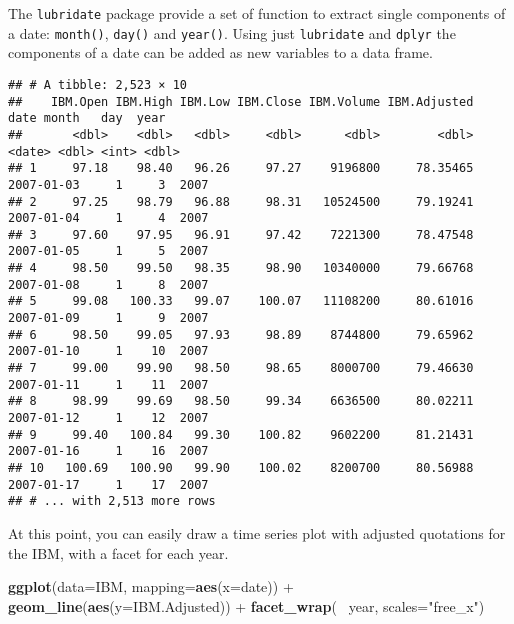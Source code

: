 \documentclass[]{book}
\newenvironment{Shaded}{\begin{snugshade}}{\end{snugshade}}
\newcommand{\KeywordTok}[1]{\textcolor[rgb]{0.13,0.29,0.53}{\textbf{{#1}}}}
\newcommand{\DataTypeTok}[1]{\textcolor[rgb]{0.13,0.29,0.53}{{#1}}}
\newcommand{\StringTok}[1]{\textcolor[rgb]{0.31,0.60,0.02}{{#1}}}
\newcommand{\NormalTok}[1]{{#1}}
\begin{document}
The \texttt{lubridate} package provide a set of function to extract
single components of a date: \texttt{month()}, \texttt{day()} and
\texttt{year()}. Using just \texttt{lubridate} and \texttt{dplyr} the
components of a date can be added as new variables to a data frame.

\begin{Shaded}
\end{Shaded}

\begin{verbatim}
## # A tibble: 2,523 × 10
##    IBM.Open IBM.High IBM.Low IBM.Close IBM.Volume IBM.Adjusted       date month   day  year
##       <dbl>    <dbl>   <dbl>     <dbl>      <dbl>        <dbl>     <date> <dbl> <int> <dbl>
## 1     97.18    98.40   96.26     97.27    9196800     78.35465 2007-01-03     1     3  2007
## 2     97.25    98.79   96.88     98.31   10524500     79.19241 2007-01-04     1     4  2007
## 3     97.60    97.95   96.91     97.42    7221300     78.47548 2007-01-05     1     5  2007
## 4     98.50    99.50   98.35     98.90   10340000     79.66768 2007-01-08     1     8  2007
## 5     99.08   100.33   99.07    100.07   11108200     80.61016 2007-01-09     1     9  2007
## 6     98.50    99.05   97.93     98.89    8744800     79.65962 2007-01-10     1    10  2007
## 7     99.00    99.90   98.50     98.65    8000700     79.46630 2007-01-11     1    11  2007
## 8     98.99    99.69   98.50     99.34    6636500     80.02211 2007-01-12     1    12  2007
## 9     99.40   100.84   99.30    100.82    9602200     81.21431 2007-01-16     1    16  2007
## 10   100.69   100.90   99.90    100.02    8200700     80.56988 2007-01-17     1    17  2007
## # ... with 2,513 more rows
\end{verbatim}

At this point, you can easily draw a time series plot with adjusted
quotations for the IBM, with a facet for each year.

\begin{Shaded}
\begin{Highlighting}[]
\KeywordTok{ggplot}\NormalTok{(}\DataTypeTok{data=}\NormalTok{IBM, }\DataTypeTok{mapping=}\KeywordTok{aes}\NormalTok{(}\DataTypeTok{x=}\NormalTok{date)) +}
\StringTok{  }\KeywordTok{geom_line}\NormalTok{(}\KeywordTok{aes}\NormalTok{(}\DataTypeTok{y=}\NormalTok{IBM.Adjusted)) +}\StringTok{ }
\StringTok{  }\KeywordTok{facet_wrap}\NormalTok{(~}\StringTok{ }\NormalTok{year, }\DataTypeTok{scales=}\StringTok{"free_x"}\NormalTok{)}
\end{Highlighting}
\end{Shaded}
\end{document}
